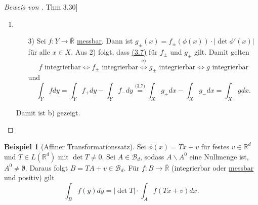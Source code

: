 \documentclass[a4paper]{report}
\newcommand{\R}{\mathbb{R}}
\newcommand{\Rq}{\overline{\R}}
\newcommand{\Borel}{\mathcal{B}}
\newcommand{\Bd}{\Borel_d}
\newcommand{\jlabel}[1]{\label{j_#1}}
\newcommand{\jshortlink}[1]{\jhyperref{#1}{\text{#1}}}
\newcommand{\jhyperref}[2]{\hyperref[j_#1]{#2}}
\newcommand{\jlink}[1]{\jhyperref{#1}{#1}}
\newcommand{\jabb}[3]{ #1: #2 \rightarrow #3 }
\theoremstyle{plain}
\theoremstyle{definition}
\newtheorem{expl}[thm]{Beispiel}
\begin{document}
{{{{\begin{proof}[Beweis von \jlink{Thm 3.30}]
\begin{enumerate}
        \item
            \begin{itemize}
                \item[3)] Sei $\jabb{f}{Y}{\Rq}$ \jlink{messbar}. Dann ist $g_\pm(x) = f_\pm(\phi(x))\cdot |\det \phi'(x)|$ für alle $x\in X$. Aus 2) folgt, dass \jlink{(3.7)} für $f_\pm$ und $g_\pm$ gilt. Damit gelten
                \[
                    f \text{ integrierbar} \Leftrightarrow f_\pm \text{ integrierbar} \overset{a)}{\Leftrightarrow} g_\pm \text{ integrierbar} \Leftrightarrow g \text{ integrierbar}
                \]
                und
                \[
                    \int_Y f dy = \int_Y f_+ dy - \int_Y f_- dy \overset{\jshortlink{(3.7)}}{=} \int_X g_+ dx - \int_X g_- dx = \int_X g dx.
                \]
            \end{itemize}
            Damit ist b) gezeigt.
    \end{enumerate}

\end{proof}


\begin{expl}[Affiner Transformationssatz]
    \jlabel{Bsp 3.34}
    Sei $\phi(x) = Tx + v$ für festes $v\in \R^d$ und $T\in L(\R^d)$ mit $\det T \ne 0$. Sei $A\in \Bd$, sodass $A\backslash A^0$ eine Nullmenge ist, $A^0 \ne \emptyset$. Daraus folgt $B=TA+v\in \Bd$. Für $\jabb{f}{B}{\Rq}$ (integrierbar oder \jlink{messbar} und positiv) gilt
    \[
        \int_B f(y) dy = |\det T|\cdot \int_A f(Tx+v) dx.
    \]
\end{expl}

}}}}
\end{document}
